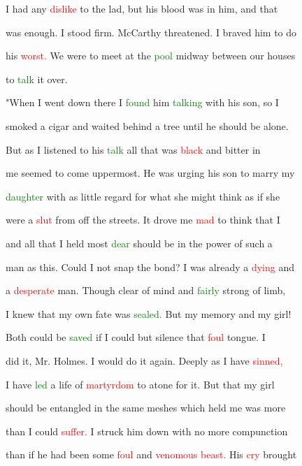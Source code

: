  I had any \textcolor{red}{dislike} to the lad, but his blood was in him, and that

 was enough. I stood firm. McCarthy \textcolor{BurntOrange}{threatened.} I braved him to do

 his \textcolor{red}{worst.} We were to meet at the \textcolor{green}{pool} midway between our houses

 to \textcolor{green}{talk} it over.



 "When I went down there I \textcolor{green}{found} him \textcolor{green}{talking} with his son, so I

 smoked a cigar and \textcolor{BurntOrange}{waited} behind a \textcolor{BurntOrange}{tree} until he should be alone.

 But as I listened to his \textcolor{green}{talk} all that was \textcolor{red}{black} and bitter in

 me seemed to come uppermost. He was urging his son to \textcolor{BurntOrange}{marry} my

 \textcolor{green}{daughter} with as little regard for what she might think as if she

 were a \textcolor{red}{slut} from off the streets. It drove me \textcolor{red}{mad} to think that I

 and all that I held most \textcolor{green}{dear} should be in the power of such a

 man as this. Could I not snap the bond? I was already a \textcolor{red}{dying} and

 a \textcolor{red}{desperate} man. Though clear of mind and \textcolor{green}{fairly} strong of limb,

 I knew that my own \textcolor{BurntOrange}{fate} was \textcolor{green}{sealed.} But my memory and my girl!

 Both could be \textcolor{green}{saved} if I could but silence that \textcolor{red}{foul} tongue. I

 did it, Mr. Holmes. I would do it again. Deeply as I have \textcolor{red}{sinned,}

 I have \textcolor{green}{led} a life of \textcolor{red}{martyrdom} to \textcolor{BurntOrange}{atone} for it. But that my girl

 should be entangled in the same meshes which held me was more

 than I could \textcolor{red}{suffer.} I struck him down with no more compunction

 than if he had been some \textcolor{red}{foul} and \textcolor{red}{venomous} \textcolor{red}{beast.} His \textcolor{red}{cry} brought

